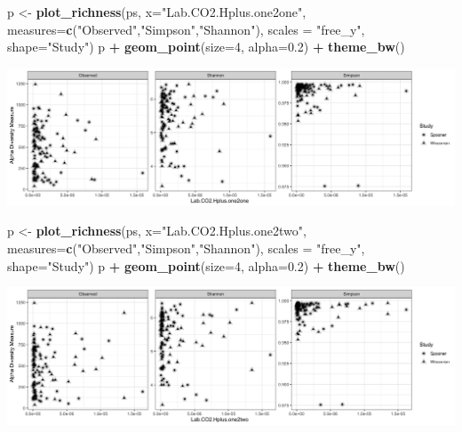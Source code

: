\documentclass[]{article}
\newenvironment{Shaded}{\begin{snugshade}}{\end{snugshade}}
\newcommand{\DataTypeTok}[1]{\textcolor[rgb]{0.13,0.29,0.53}{#1}}
\newcommand{\DecValTok}[1]{\textcolor[rgb]{0.00,0.00,0.81}{#1}}
\newcommand{\FloatTok}[1]{\textcolor[rgb]{0.00,0.00,0.81}{#1}}
\newcommand{\KeywordTok}[1]{\textcolor[rgb]{0.13,0.29,0.53}{\textbf{#1}}}
\newcommand{\NormalTok}[1]{#1}
\newcommand{\OperatorTok}[1]{\textcolor[rgb]{0.81,0.36,0.00}{\textbf{#1}}}
\newcommand{\StringTok}[1]{\textcolor[rgb]{0.31,0.60,0.02}{#1}}
\begin{document}
\begin{Shaded}
\begin{Highlighting}[]
\NormalTok{p <-}\StringTok{ }\KeywordTok{plot_richness}\NormalTok{(ps, }\DataTypeTok{x=}\StringTok{"Lab.CO2.Hplus.one2one"}\NormalTok{, }\DataTypeTok{measures=}\KeywordTok{c}\NormalTok{(}\StringTok{"Observed"}\NormalTok{,}\StringTok{"Simpson"}\NormalTok{,}\StringTok{"Shannon"}\NormalTok{), }\DataTypeTok{scales =} \StringTok{"free_y"}\NormalTok{, }\DataTypeTok{shape=}\StringTok{"Study"}\NormalTok{)}
\NormalTok{p }\OperatorTok{+}\StringTok{ }\KeywordTok{geom_point}\NormalTok{(}\DataTypeTok{size=}\DecValTok{4}\NormalTok{, }\DataTypeTok{alpha=}\FloatTok{0.2}\NormalTok{) }\OperatorTok{+}\StringTok{ }\KeywordTok{theme_bw}\NormalTok{()}
\end{Highlighting}
\end{Shaded}

\includegraphics{output-rmd/richness-ph-Lab.CO2.Hplus.one2one-1.png}

\begin{Shaded}
\begin{Highlighting}[]
\NormalTok{p <-}\StringTok{ }\KeywordTok{plot_richness}\NormalTok{(ps, }\DataTypeTok{x=}\StringTok{"Lab.CO2.Hplus.one2two"}\NormalTok{, }\DataTypeTok{measures=}\KeywordTok{c}\NormalTok{(}\StringTok{"Observed"}\NormalTok{,}\StringTok{"Simpson"}\NormalTok{,}\StringTok{"Shannon"}\NormalTok{), }\DataTypeTok{scales =} \StringTok{"free_y"}\NormalTok{, }\DataTypeTok{shape=}\StringTok{"Study"}\NormalTok{)}
\NormalTok{p }\OperatorTok{+}\StringTok{ }\KeywordTok{geom_point}\NormalTok{(}\DataTypeTok{size=}\DecValTok{4}\NormalTok{, }\DataTypeTok{alpha=}\FloatTok{0.2}\NormalTok{) }\OperatorTok{+}\StringTok{ }\KeywordTok{theme_bw}\NormalTok{()}
\end{Highlighting}
\end{Shaded}

\includegraphics{output-rmd/richness-ph-Lab.CO2.Hplus.one2two-1.png}
\end{document}
